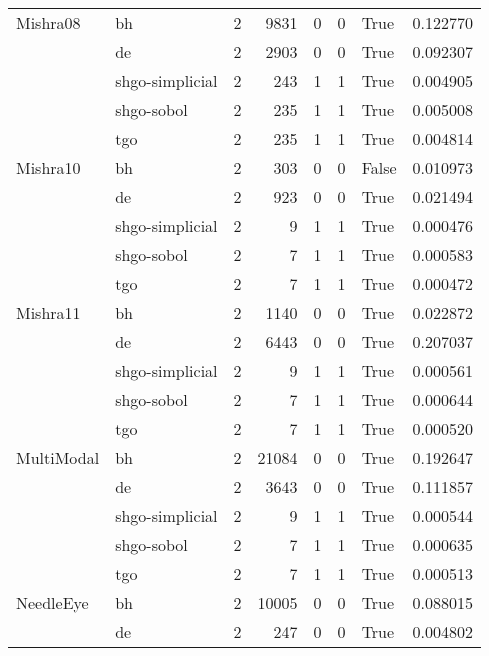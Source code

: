 \begin{longtable}{llrrrrlr}
Mishra08 & bh &     2 &     9831 &      0 &       0 &    True &    0.122770 \\
         & de &     2 &     2903 &      0 &       0 &    True &    0.092307 \\
         & shgo-simplicial &     2 &      243 &      1 &       1 &    True &    0.004905 \\
         & shgo-sobol &     2 &      235 &      1 &       1 &    True &    0.005008 \\
         & tgo &     2 &      235 &      1 &       1 &    True &    0.004814 \\
Mishra10 & bh &     2 &      303 &      0 &       0 &   False &    0.010973 \\
         & de &     2 &      923 &      0 &       0 &    True &    0.021494 \\
         & shgo-simplicial &     2 &        9 &      1 &       1 &    True &    0.000476 \\
         & shgo-sobol &     2 &        7 &      1 &       1 &    True &    0.000583 \\
         & tgo &     2 &        7 &      1 &       1 &    True &    0.000472 \\
Mishra11 & bh &     2 &     1140 &      0 &       0 &    True &    0.022872 \\
         & de &     2 &     6443 &      0 &       0 &    True &    0.207037 \\
         & shgo-simplicial &     2 &        9 &      1 &       1 &    True &    0.000561 \\
         & shgo-sobol &     2 &        7 &      1 &       1 &    True &    0.000644 \\
         & tgo &     2 &        7 &      1 &       1 &    True &    0.000520 \\
MultiModal & bh &     2 &    21084 &      0 &       0 &    True &    0.192647 \\
         & de &     2 &     3643 &      0 &       0 &    True &    0.111857 \\
         & shgo-simplicial &     2 &        9 &      1 &       1 &    True &    0.000544 \\
         & shgo-sobol &     2 &        7 &      1 &       1 &    True &    0.000635 \\
         & tgo &     2 &        7 &      1 &       1 &    True &    0.000513 \\
NeedleEye & bh &     2 &    10005 &      0 &       0 &    True &    0.088015 \\
         & de &     2 &      247 &      0 &       0 &    True &    0.004802 \\

\end{longtable}

